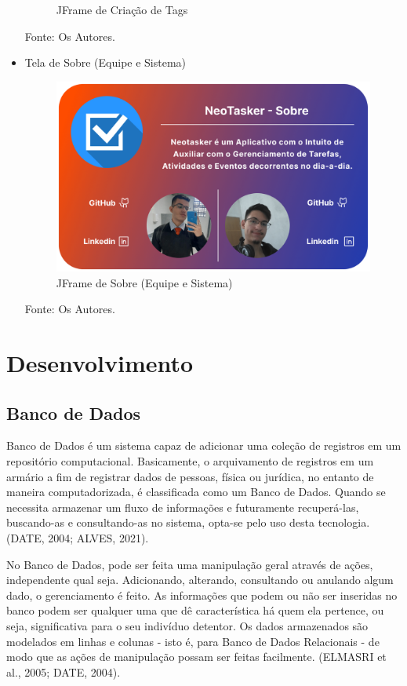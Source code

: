 \documentclass[a4paper,12pt]{article}
\begin{document}
\begin{itemize}
\begin{figure}[H]
		\caption{JFrame de Criação de Tags}
	\end{figure}
	\noindent Fonte: Os Autores.
	\item Tela de Sobre (Equipe e Sistema)
	\begin{figure}[H]
		\centering
		\includegraphics[scale=0.19]{prototypes/white/About Us Panel Window.png}
		\caption{JFrame de Sobre (Equipe e Sistema)}
	\end{figure}
	\noindent Fonte: Os Autores.
\end{itemize}


\pagebreak
\section{Desenvolvimento}
\subsection{Banco de Dados}
Banco de Dados é um sistema capaz de adicionar uma coleção de registros em um repositório computacional. Basicamente, o arquivamento de 
registros em um armário a fim de registrar dados de pessoas, física ou jurídica, no entanto de maneira computadorizada, é classificada 
como um Banco de Dados. Quando se necessita armazenar um fluxo de informações e futuramente recuperá-las, buscando-as e consultando-as 
no sistema, opta-se pelo uso desta tecnologia. (DATE, 2004; ALVES, 2021).

No Banco de Dados, pode ser feita uma manipulação geral através de ações, independente qual seja. Adicionando, alterando, consultando 
ou anulando algum dado, o gerenciamento é feito. As informações que podem ou não ser inseridas no banco podem ser qualquer uma que 
dê característica há quem ela pertence, ou seja, significativa para o seu indivíduo detentor. Os dados armazenados são modelados em 
linhas e colunas - isto é, para Banco de Dados Relacionais - de modo que as ações de manipulação possam ser feitas facilmente. (ELMASRI et al., 2005; DATE, 2004).
\end{document}
